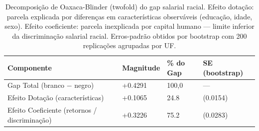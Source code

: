 \begin{table}
\caption{Decomposição de Oaxaca-Blinder (twofold) do gap salarial racial. Efeito dotação: parcela explicada por diferenças em características observáveis (educação, idade, sexo). Efeito coeficiente: parcela inexplicada por capital humano — limite inferior da discriminação salarial racial. Erros-padrão obtidos por bootstrap com 200 replicações agrupadas por UF.}
\label{tab:oaxaca_blinder}
\begin{tabular}{llll}
\toprule
Componente & Magnitude & \% do Gap & SE (bootstrap) \\
\midrule
Gap Total (branco − negro) & +0.4291 & 100,0 & — \\
Efeito Dotação (características) & +0.1065 & 24.8 & (0.0154) \\
Efeito Coeficiente (retornos / discriminação) & +0.3226 & 75.2 & (0.0283) \\
\bottomrule
\end{tabular}
\end{table}
